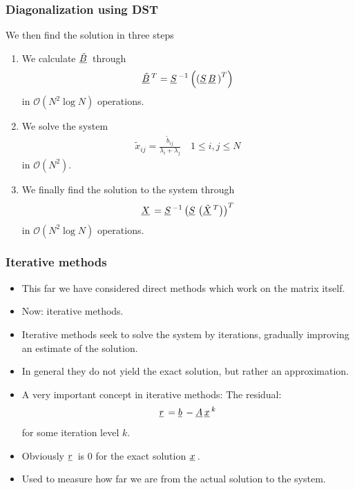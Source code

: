 \documentclass{beamer}
\newcommand{\ub}[1]{\underbar{$#1$}\,}
\begin{document}
\begin{frame}\frametitle{Diagonalization using DST}
  We then find the solution in three steps
  \begin{enumerate}
    \item We calculate $\ub{\tilde{B}}$ through
      \[
        \ub{\tilde{B}}^T = \ub{S}^{-1}\left(\left(\ub{S}\ub{B}\right)^T\right)
      \]
      in $\mathcal{O}\left(N^2\log N\right)$ operations.
    \item We solve the system
      \[
        \begin{split}
          \tilde{x}_{ij} = \frac{\tilde{b}_{ij}}{\lambda_i+\lambda_j}\quad 1 \leq i,j \leq N
        \end{split}
      \]
      in $\mathcal{O}\left(N^2\right)$.
    \item We finally find the solution to the system through 
      \[
        \ub{X} = \ub{S}^{-1}\left(\ub{S}\left(\ub{\tilde{X}}^T\right)\right)^T
      \]
      in $\mathcal{O}\left(N^2\log N\right)$ operations.
  \end{enumerate}
\end{frame}
\begin{frame}\frametitle{Iterative methods}
  \begin{itemize}
    \item This far we have considered direct methods which work on the matrix itself.
    \item Now: iterative methods.
    \item Iterative methods seek to solve the system by iterations, gradually improving an estimate of
      the solution.
    \item In general they do not yield the exact solution, but rather an approximation.
    \item A very important concept in iterative methods: The residual:
      \[
        \ub{r} = \ub{b}-\ub{A}\ub{x}^k
      \]
      for some iteration level $k$.
    \item Obviously $\ub{r}$ is 0 for the exact solution $\ub{x}$.
    \item Used to measure how far we are from the actual solution to the system.
  \end{itemize}
\end{frame}
\end{document}
